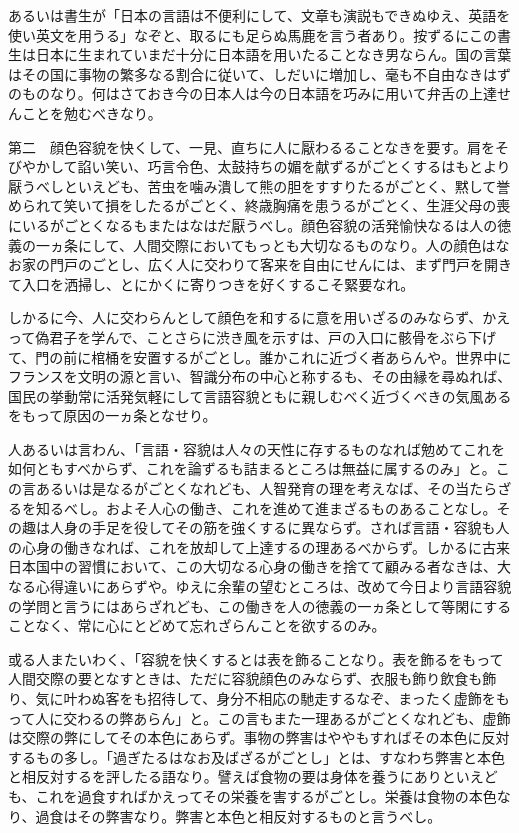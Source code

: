 \documentclass[a4paper, platex, dvipdfmx]{jsarticle}
\begin{document}
あるいは書生が「日本の言語は不便利にして、文章も演説もできぬゆえ、英語を使い英文を用うる」なぞと、取るにも足らぬ馬鹿を言う者あり。按ずるにこの書生は日本に生まれていまだ十分に日本語を用いたることなき男ならん。国の言葉はその国に事物の繁多なる割合に従いて、しだいに増加し、毫も不自由なきはずのものなり。何はさておき今の日本人は今の日本語を巧みに用いて弁舌の上達せんことを勉むべきなり。

第二　顔色容貌を快くして、一見、直ちに人に厭わるることなきを要す。肩をそびやかして諂い笑い、巧言令色、太鼓持ちの媚を献ずるがごとくするはもとより厭うべしといえども、苦虫を噛み潰して熊の胆をすすりたるがごとく、黙して誉められて笑いて損をしたるがごとく、終歳胸痛を患うるがごとく、生涯父母の喪にいるがごとくなるもまたはなはだ厭うべし。顔色容貌の活発愉快なるは人の徳義の一ヵ条にして、人間交際においてもっとも大切なるものなり。人の顔色はなお家の門戸のごとし、広く人に交わりて客来を自由にせんには、まず門戸を開きて入口を洒掃し、とにかくに寄りつきを好くするこそ緊要なれ。

しかるに今、人に交わらんとして顔色を和するに意を用いざるのみならず、かえって偽君子を学んで、ことさらに渋き風を示すは、戸の入口に骸骨をぶら下げて、門の前に棺桶を安置するがごとし。誰かこれに近づく者あらんや。世界中にフランスを文明の源と言い、智識分布の中心と称するも、その由縁を尋ぬれば、国民の挙動常に活発気軽にして言語容貌ともに親しむべく近づくべきの気風あるをもって原因の一ヵ条となせり。

人あるいは言わん、「言語・容貌は人々の天性に存するものなれば勉めてこれを如何ともすべからず、これを論ずるも詰まるところは無益に属するのみ」と。この言あるいは是なるがごとくなれども、人智発育の理を考えなば、その当たらざるを知るべし。およそ人心の働き、これを進めて進まざるものあることなし。その趣は人身の手足を役してその筋を強くするに異ならず。されば言語・容貌も人の心身の働きなれば、これを放却して上達するの理あるべからず。しかるに古来日本国中の習慣において、この大切なる心身の働きを捨てて顧みる者なきは、大なる心得違いにあらずや。ゆえに余輩の望むところは、改めて今日より言語容貌の学問と言うにはあらざれども、この働きを人の徳義の一ヵ条として等閑にすることなく、常に心にとどめて忘れざらんことを欲するのみ。

或る人またいわく、「容貌を快くするとは表を飾ることなり。表を飾るをもって人間交際の要となすときは、ただに容貌顔色のみならず、衣服も飾り飲食も飾り、気に叶わぬ客をも招待して、身分不相応の馳走するなぞ、まったく虚飾をもって人に交わるの弊あらん」と。この言もまた一理あるがごとくなれども、虚飾は交際の弊にしてその本色にあらず。事物の弊害はややもすればその本色に反対するもの多し。「過ぎたるはなお及ばざるがごとし」とは、すなわち弊害と本色と相反対するを評したる語なり。譬えば食物の要は身体を養うにありといえども、これを過食すればかえってその栄養を害するがごとし。栄養は食物の本色なり、過食はその弊害なり。弊害と本色と相反対するものと言うべし。
\end{document}
